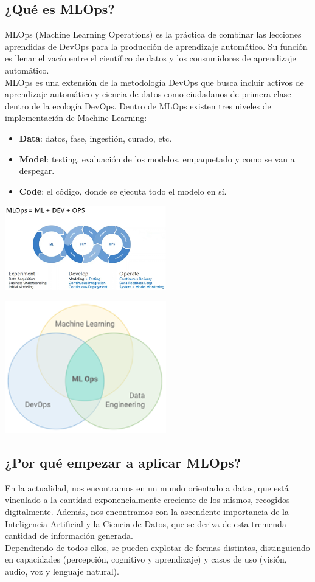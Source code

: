 \documentclass[twoside,twocolumn]{article}
\begin{document}
\subsection{¿Qué es MLOps?}
\noindent MLOps (Machine Learning Operations) es la práctica de combinar las lecciones aprendidas de DevOps para la producción de aprendizaje automático. Su función es llenar el vacío entre el científico de datos y los consumidores de aprendizaje automático.\\[0.1in]
MLOps es una extensión de la metodología DevOps que busca incluir activos de aprendizaje automático y ciencia de datos como ciudadanos de primera clase dentro de la ecología DevOps. Dentro de MLOps existen tres niveles de implementación de Machine Learning:
\begin{itemize}
    \item \textbf{Data}: datos, fase, ingestión, curado, etc.
    \item \textbf{Model}: testing, evaluación de los modelos, empaquetado y como se van a despegar.
    \item \textbf{Code}: el código, donde se ejecuta todo el modelo en sí.
\end{itemize}
\begin{center}
    \includegraphics[width=7cm]{./img/img1.png}
\end{center}
\begin{center}
    \includegraphics[width=7cm]{./img/img2.png}
\end{center}

\subsection{¿Por qué empezar a aplicar MLOps?}
\noindent En la actualidad, nos encontramos en un mundo orientado a datos, que está vinculado a la cantidad exponencialmente creciente de los mismos, recogidos digitalmente. Además, nos encontramos con la ascendente importancia de la Inteligencia Artificial y la Ciencia de Datos, que se deriva de esta tremenda cantidad de información generada.\\[0.1in]
Dependiendo de todos ellos, se pueden explotar de formas distintas, distinguiendo en capacidades (percepción, cognitivo y aprendizaje) y casos de uso (visión, audio, voz y lenguaje natural).
\end{document}
